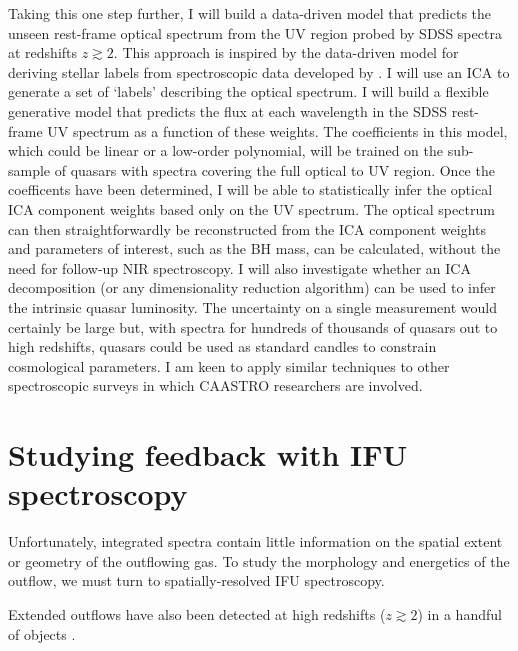 Taking this one step further, I will build a data-driven model that predicts the unseen rest-frame optical spectrum from the UV region probed by SDSS spectra at redshifts $z\gtrsim2$.
This approach is inspired by the data-driven model for deriving stellar labels from spectroscopic data developed by \citet{ness15}.
I will use an ICA to generate a set of `labels' describing the optical spectrum. 
I will build a flexible generative model that predicts the flux at each wavelength in the SDSS rest-frame UV spectrum as a function of these weights.
The coefficients in this model, which could be linear or a low-order polynomial, will be trained on the sub-sample of quasars with spectra covering the full optical to UV region. 
Once the coefficents have been determined, I will be able to statistically infer the optical ICA component weights based only on the UV spectrum. 
The optical spectrum can then straightforwardly be reconstructed from the ICA component weights and parameters of interest, such as the BH mass, can be calculated, without the need for follow-up NIR spectroscopy. 
I will also investigate whether an ICA decomposition (or any dimensionality reduction algorithm) can be used to infer the intrinsic quasar luminosity. 
The uncertainty on a single measurement would certainly be large but, with spectra for hundreds of thousands of quasars out to high redshifts, quasars could be used as standard candles to constrain cosmological parameters. 
I am keen to apply similar techniques to other spectroscopic surveys in which CAASTRO researchers are involved. 


\section{Studying feedback with IFU spectroscopy}

Unfortunately, integrated spectra contain little information on the spatial extent or geometry of the outflowing gas.  
To study the morphology and energetics of the outflow, we must turn to spatially-resolved IFU spectroscopy.



Extended outflows have also been detected at high redshifts ($z\gtrsim2$) in a handful of objects \citep[e.g.][]{carniani15}. 

